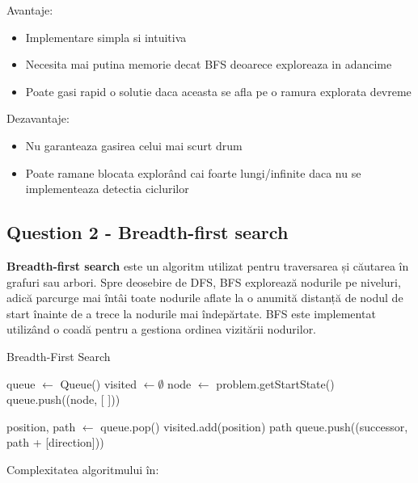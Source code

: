 \par Avantaje:
\begin{itemize}
	\item Implementare simpla si intuitiva
	\item Necesita mai putina memorie decat BFS deoarece exploreaza in adancime
	\item Poate gasi rapid o solutie daca aceasta se afla pe o ramura explorata devreme
\end{itemize}

\par Dezavantaje:
\begin{itemize}
	\item Nu garanteaza gasirea celui mai scurt drum
	\item Poate ramane blocata explorând cai foarte lungi/infinite daca nu se implementeaza detectia ciclurilor
\end{itemize}

\pagebreak

\subsection{Question 2 - Breadth-first search}
\par \textbf{Breadth-first search} este un algoritm utilizat pentru traversarea și căutarea în grafuri sau arbori. Spre deosebire de DFS, BFS explorează nodurile pe niveluri, adică parcurge mai întâi toate nodurile aflate la o anumită distanță de nodul de start înainte de a trece la nodurile mai îndepărtate. BFS este implementat utilizând o coadă pentru a gestiona ordinea vizitării nodurilor.

\begin{algorithm}
\caption{Breadth-First Search}
\begin{algorithmic}[1]
    \State queue $\gets$ Queue()
    \State visited $\gets \emptyset$
    \State node $\gets$ problem.getStartState()
    \State queue.push((node, [ ]))
    
        \State position, path $\gets$ queue.pop()
            \State visited.add(position)
                \Return path
            \EndIf
                    \State queue.push((successor, path + [direction]))
                \EndIf
            \EndFor
        \EndIf
    \EndWhile \\
    \Return [ ]
\EndFunction
\end{algorithmic}
\end{algorithm}
\par Complexitatea algoritmului în:

